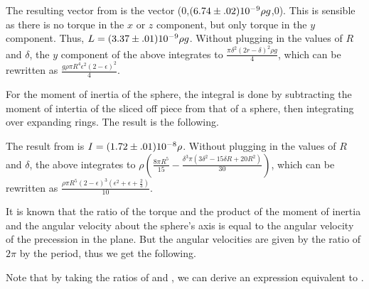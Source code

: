 \begin{paper}
\begin{paperwhere}
\end{paperwhere}

The resulting vector from \eqL is the vector (0,$(6.74\pm.02)\SI{E-9}{}\rho g$,0).
This is sensible as there is no torque in the $x$ or $z$ component, but only torque in the $y$ component.
Thus, $L=(3.37\pm.01)\SI{E-9}{}\rho g$.
Without plugging in the values of $R$ and $\delta$, the $y$ component of the above integrates to $\frac{\pi\delta^2(2r-\delta)^2\rho g}{4}$, which can be rewritten as $\frac{g\rho\pi R^4\epsilon^2(2-\epsilon)^2}{4}$.

For the moment of inertia of the sphere, the integral is done by subtracting the moment of intertia of the sliced off piece from that of a sphere, then integrating over expanding rings.
The result is the following.

\begin{paperwhere}
\end{paperwhere}

The result from \eqI is $I=(1.72\pm.01)\SI{E-8}{}\rho$.
Without plugging in the values of $R$ and $\delta$, the above integrates to $\rho\left(\frac{8\pi R^5}{15}-\frac{\delta^3\pi(3\delta^2-15\delta R+20R^2)}{30}\right)$, which can be rewritten as $\frac{\rho\pi R^5(2-\epsilon)^3(\epsilon^2+\epsilon+\frac23)}{10}$.

It is known that the ratio of the torque and the product of the moment of inertia and the angular velocity about the sphere's axis is equal to the angular velocity of the precession in the plane.
But the angular velocities are given by the ratio of $2\pi$ by the period, thus we get the following.

\begin{paperwhere}
\end{paperwhere}

Note that by taking the ratios of \eqL and \eqI, we can derive an expression equivalent to \eqR.


\end{paper}
